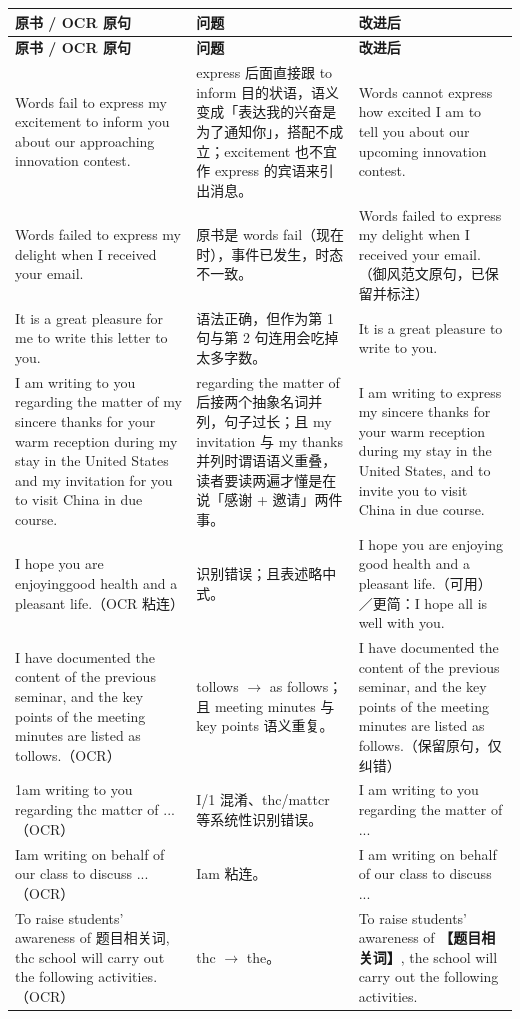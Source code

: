 \documentclass[11pt,a4paper]{ctexart}
\newcommand{\fillin}[1]{{\bfseries【#1】}}
\begin{document}
\begin{longtable}{L{6.4cm}L{4.6cm}L{4.8cm}}
\toprule
\textbf{原书 / OCR 原句} & \textbf{问题} & \textbf{改进后} \\
\midrule
\endfirsthead
\toprule
\textbf{原书 / OCR 原句} & \textbf{问题} & \textbf{改进后} \\
\midrule
\endhead
\bottomrule
\endlastfoot

Words fail to express my excitement to inform you about our approaching innovation contest. & express 后面直接跟 to inform 目的状语，语义变成「表达我的兴奋是为了通知你」，搭配不成立；excitement 也不宜作 express 的宾语来引出消息。 & Words cannot express how excited I am to tell you about our upcoming innovation contest. \\
\midrule
Words failed to express my delight when I received your email. & 原书是 words fail（现在时），事件已发生，时态不一致。 & Words failed to express my delight when I received your email.（御风范文原句，已保留并标注） \\
\midrule
It is a great pleasure for me to write this letter to you. & 语法正确，但作为第 1 句与第 2 句连用会吃掉太多字数。 & It is a great pleasure to write to you. \\
\midrule
I am writing to you regarding the matter of my sincere thanks for your warm reception during my stay in the United States and my invitation for you to visit China in due course. & regarding the matter of 后接两个抽象名词并列，句子过长；且 my invitation 与 my thanks 并列时谓语语义重叠，读者要读两遍才懂是在说「感谢 + 邀请」两件事。 & I am writing to express my sincere thanks for your warm reception during my stay in the United States, and to invite you to visit China in due course. \\
\midrule
I hope you are enjoyinggood health and a pleasant life.（OCR 粘连） & 识别错误；且表述略中式。 & I hope you are enjoying good health and a pleasant life.（可用）／更简：I hope all is well with you. \\
\midrule
I have documented the content of the previous seminar, and the key points of the meeting minutes are listed as tollows.（OCR） & tollows $\rightarrow$ as follows；且 meeting minutes 与 key points 语义重复。 & I have documented the content of the previous seminar, and the key points of the meeting minutes are listed as follows.（保留原句，仅纠错） \\
\midrule
1am writing to you regarding thc mattcr of ...（OCR） & I/1 混淆、thc/mattcr 等系统性识别错误。 & I am writing to you regarding the matter of ... \\
\midrule
Iam writing on behalf of our class to discuss ...（OCR） & Iam 粘连。 & I am writing on behalf of our class to discuss ... \\
\midrule
To raise students' awareness of 题目相关词, thc school will carry out the following activities.（OCR） & thc $\rightarrow$ the。 & To raise students' awareness of \fillin{题目相关词}, the school will carry out the following activities. \\

\end{longtable}
\end{document}
